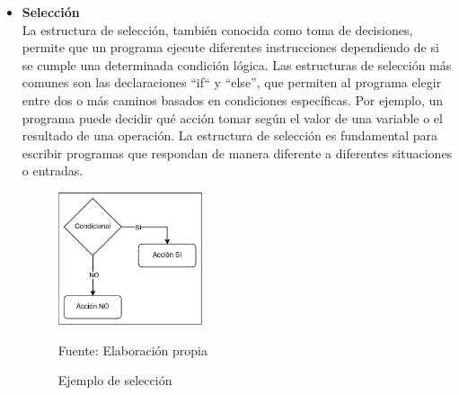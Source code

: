 \begin{itemize}
  \item \textbf{Selección} \\
  La estructura de selección, también conocida como toma de decisiones, permite que un programa ejecute diferentes instrucciones dependiendo de si se cumple una determinada condición lógica. Las estructuras de selección más comunes son las declaraciones ``if`` y ``else'', que permiten al programa elegir entre dos o más caminos basados en condiciones específicas. Por ejemplo, un programa puede decidir qué acción tomar según el valor de una variable o el resultado de una operación. La estructura de selección es fundamental para escribir programas que respondan de manera diferente a diferentes situaciones o entradas.
  \begin{figure}[!h]
    \centering
    \includegraphics[width=0.4\textwidth]{images/seleccion.png}
    \caption{Ejemplo de selección}
    \centering Fuente: Elaboración propia
    \label{fig:seleccion}
  \end{figure}
  \newline
  \newline


\end{itemize}
